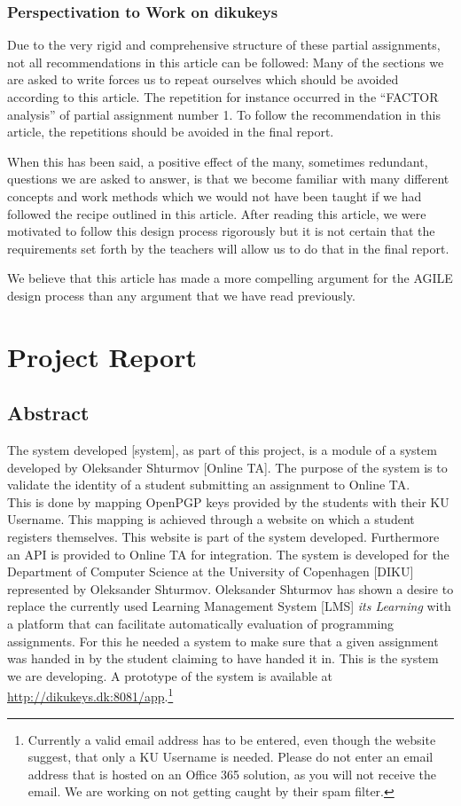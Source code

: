 \documentclass[11pt,a4paper]{report}
\begin{document}
\subsection{Perspectivation to Work on dikukeys}
Due to the very rigid and comprehensive structure of these partial assignments, not all recommendations in this article can be followed: Many of the sections we are asked to write forces us to repeat ourselves which should be avoided according to this article. The repetition for instance occurred in the ``FACTOR analysis'' of partial assignment number 1. To follow the recommendation in this article, the repetitions should be avoided in the final report.

When this has been said, a positive effect of the many, sometimes redundant, questions we are asked to answer, is that we become familiar with many different concepts and work methods which we would not have been taught if we had followed the recipe outlined in this article. After reading this article, we were motivated to follow this design process rigorously but it is not certain that the requirements set forth by the teachers will allow us to do that in the final report.

We believe that this article has made a more compelling argument for the AGILE design process than any argument that we have read previously.
\chapter{Project Report}\label{ch:Project_Report}

\section{Abstract}\label{sec:Abstract}
The system developed [system], as part of this project, is a module of a system developed by Oleksander Shturmov [Online TA]. The purpose of the system is to validate the identity of a student submitting an assignment to Online TA. \\
This is done by mapping OpenPGP keys provided by the students with their KU Username. This mapping is achieved through a website on which a student registers themselves. This website is part of the system developed. Furthermore an API is provided to Online TA for integration. The system is developed for the Department of Computer Science at the University of Copenhagen [DIKU] represented by Oleksander Shturmov. Oleksander Shturmov has shown a desire to replace the currently used Learning Management System [LMS] \textit{its Learning} with a platform that can facilitate automatically evaluation of programming assignments. For this he needed a system to make sure that a given assignment was handed in by the student claiming to have handed it in. This is the system we are developing.
A prototype of the system is available at \url{http://dikukeys.dk:8081/app}.\footnote{Currently a valid email address has to be entered, even though the website suggest, that only a KU Username is needed. Please do not enter an email address that is hosted on an Office 365 solution, as you will not receive the email. We are working on not getting caught by their spam filter.}
\end{document}
